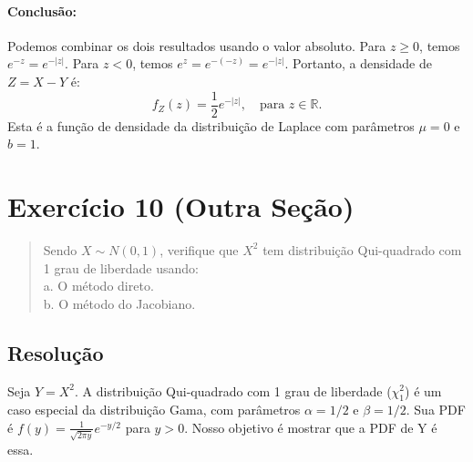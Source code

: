 \documentclass[12pt]{article}
\begin{document}
\paragraph{Conclusão:}
Podemos combinar os dois resultados usando o valor absoluto. Para $z \ge 0$, temos $e^{-z} = e^{-|z|}$. Para $z < 0$, temos $e^z = e^{-(-z)} = e^{-|z|}$.
Portanto, a densidade de $Z=X-Y$ é:
\[ f_Z(z) = \frac{1}{2} e^{-|z|}, \quad \text{para } z \in \mathbb{R}. \]
Esta é a função de densidade da distribuição de Laplace com parâmetros $\mu=0$ e $b=1$. \hfill \qedsymbol

\pagebreak

\section{Exercício 10 (Outra Seção)}

\begin{quote}
Sendo $X \sim N(0,1)$, verifique que $X^2$ tem distribuição Qui-quadrado com 1 grau de liberdade usando: \\
a. O método direto. \\
b. O método do Jacobiano.
\end{quote}

\subsection*{Resolução}
Seja $Y = X^2$. A distribuição Qui-quadrado com 1 grau de liberdade ($\chi^2_1$) é um caso especial da distribuição Gama, com parâmetros $\alpha=1/2$ e $\beta=1/2$. Sua PDF é $f(y) = \frac{1}{\sqrt{2\pi y}} e^{-y/2}$ para $y>0$. Nosso objetivo é mostrar que a PDF de Y é essa.
\end{document}
